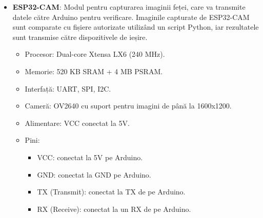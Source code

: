 \documentclass{report}
\begin{document}
\begin{itemize}
\vspace*{1cm}
    \item \textbf{ESP32-CAM}: Modul pentru capturarea imaginii feței, care va transmite datele către Arduino pentru verificare. Imaginile capturate de ESP32-CAM sunt comparate cu fișiere autorizate utilizând un script Python, iar rezultatele sunt transmise către dispozitivele de ieșire.
    \begin{itemize}
        \item Procesor: Dual-core Xtensa LX6 (240 MHz).
        \item Memorie: 520 KB SRAM + 4 MB PSRAM.
        \item Interfață: UART, SPI, I2C.
        \item Cameră: OV2640 cu suport pentru imagini de până la 1600x1200.
        \item Alimentare: VCC conectat la 5V.
        \item Pini:
            \begin{itemize}
                \item VCC: conectat la 5V pe Arduino.
                \item GND: conectat la GND pe Arduino.
                \item TX (Transmit): conectat la TX de pe Arduino.
                \item RX (Receive): conectat la un RX de pe Arduino.
                

\end{itemize}
\end{itemize}
\end{itemize}
\end{document}
